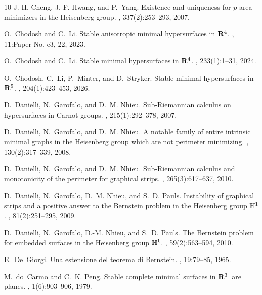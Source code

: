 \documentclass[11pt]{amsart}
\theoremstyle{definition}
\theoremstyle{remark}
\numberwithin{equation}{section}
\begin{document}
\begin{thebibliography}{10}
J.-H. Cheng, J.-F. Hwang, and P.~Yang.
\newblock Existence and uniqueness for {$p$}-area minimizers in the {H}eisenberg group.
, 337(2):253--293, 2007.

O.~Chodosh and C.~Li.
\newblock Stable anisotropic minimal hypersurfaces in {${\bf R}^4$}.
, 11:Paper No. e3, 22, 2023.

O.~Chodosh and C.~Li.
\newblock Stable minimal hypersurfaces in {${\bf R}^4$}.
, 233(1):1--31, 2024.

O.~Chodosh, C.~Li, P.~Minter, and D.~Stryker.
\newblock Stable minimal hypersurfaces in {$\bold R^5$}.
, 204(1):423--453, 2026.

D.~Danielli, N.~Garofalo, and D.~M. Nhieu.
\newblock Sub-{R}iemannian calculus on hypersurfaces in {C}arnot groups.
, 215(1):292--378, 2007.

D.~Danielli, N.~Garofalo, and D.~M. Nhieu.
\newblock A notable family of entire intrinsic minimal graphs in the {H}eisenberg group which are not perimeter minimizing.
, 130(2):317--339, 2008.

D.~Danielli, N.~Garofalo, and D.~M. Nhieu.
\newblock Sub-{R}iemannian calculus and monotonicity of the perimeter for graphical strips.
, 265(3):617--637, 2010.

D.~Danielli, N.~Garofalo, D.~M. Nhieu, and S.~D. Pauls.
\newblock Instability of graphical strips and a positive answer to the {B}ernstein problem in the {H}eisenberg group {$\Bbb H^1$}.
, 81(2):251--295, 2009.

D.~Danielli, N.~Garofalo, D.-M. Nhieu, and S.~D. Pauls.
\newblock The {B}ernstein problem for embedded surfaces in the {H}eisenberg group {$\Bbb H^1$}.
, 59(2):563--594, 2010.

E.~De~Giorgi.
\newblock Una estensione del teorema di {B}ernstein.
, 19:79--85, 1965.

M.~do~Carmo and C.~K. Peng.
\newblock Stable complete minimal surfaces in {${\bf R}\sp{3}$}\ are planes.
, 1(6):903--906, 1979.


\end{thebibliography}
\end{document}
